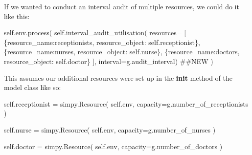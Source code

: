 \documentclass[
  letterpaper,
  DIV=11,
  numbers=noendperiod]{scrreprt}
\newenvironment{Shaded}{}{}
\newcommand{\CommentTok}[1]{\textcolor[rgb]{0.42,0.45,0.49}{#1}}
\newcommand{\NormalTok}[1]{\textcolor[rgb]{0.14,0.16,0.18}{#1}}
\newcommand{\OperatorTok}[1]{\textcolor[rgb]{0.14,0.16,0.18}{#1}}
\newcommand{\StringTok}[1]{\textcolor[rgb]{0.01,0.18,0.38}{#1}}
\newcommand{\VariableTok}[1]{\textcolor[rgb]{0.89,0.38,0.04}{#1}}
\begin{document}
\begin{tcolorbox}[enhanced jigsaw, colframe=quarto-callout-tip-color-frame, bottomtitle=1mm, breakable, rightrule=.15mm, coltitle=black, colbacktitle=quarto-callout-tip-color!10!white, opacityback=0, leftrule=.75mm, arc=.35mm, toptitle=1mm, title=\textcolor{quarto-callout-tip-color}{\faLightbulb}\hspace{0.5em}{Tip}, titlerule=0mm, colback=white, toprule=.15mm, bottomrule=.15mm, left=2mm, opacitybacktitle=0.6]

If we wanted to conduct an interval audit of multiple resources, we
could do it like this:

\begin{Shaded}
\begin{Highlighting}[]
\VariableTok{self}\NormalTok{.env.process(}
    \VariableTok{self}\NormalTok{.interval\_audit\_utilisation(}
\NormalTok{      resources}\OperatorTok{=}\NormalTok{ [}
\NormalTok{        \{}\StringTok{\textquotesingle{}resource\_name\textquotesingle{}}\NormalTok{:}\StringTok{\textquotesingle{}receptionists\textquotesingle{}}\NormalTok{, }\StringTok{\textquotesingle{}resource\_object\textquotesingle{}}\NormalTok{: }\VariableTok{self}\NormalTok{.receptionist\},}
\NormalTok{        \{}\StringTok{\textquotesingle{}resource\_name\textquotesingle{}}\NormalTok{:}\StringTok{\textquotesingle{}nurses\textquotesingle{}}\NormalTok{, }\StringTok{\textquotesingle{}resource\_object\textquotesingle{}}\NormalTok{: }\VariableTok{self}\NormalTok{.nurse\},}
\NormalTok{        \{}\StringTok{\textquotesingle{}resource\_name\textquotesingle{}}\NormalTok{:}\StringTok{\textquotesingle{}doctors\textquotesingle{}}\NormalTok{, }\StringTok{\textquotesingle{}resource\_object\textquotesingle{}}\NormalTok{: }\VariableTok{self}\NormalTok{.doctor\}}
\NormalTok{        ],}
\NormalTok{      interval}\OperatorTok{=}\NormalTok{g.audit\_interval) }\CommentTok{\#\#NEW}
\NormalTok{  )}
\end{Highlighting}
\end{Shaded}

This assumes our additional resources were set up in the \textbf{init}
method of the model class like so:

\begin{Shaded}
\begin{Highlighting}[]
  \VariableTok{self}\NormalTok{.receptionist }\OperatorTok{=}\NormalTok{ simpy.Resource(}
      \VariableTok{self}\NormalTok{.env, capacity}\OperatorTok{=}\NormalTok{g.number\_of\_receptionists}
\NormalTok{  )}

  \VariableTok{self}\NormalTok{.nurse }\OperatorTok{=}\NormalTok{ simpy.Resource(}
    \VariableTok{self}\NormalTok{.env, capacity}\OperatorTok{=}\NormalTok{g.number\_of\_nurses}
\NormalTok{    )}

  \VariableTok{self}\NormalTok{.doctor }\OperatorTok{=}\NormalTok{ simpy.Resource(}
      \VariableTok{self}\NormalTok{.env, capacity}\OperatorTok{=}\NormalTok{g.number\_of\_doctors}
\NormalTok{  )}
\end{Highlighting}
\end{Shaded}

\end{tcolorbox}
\end{document}
